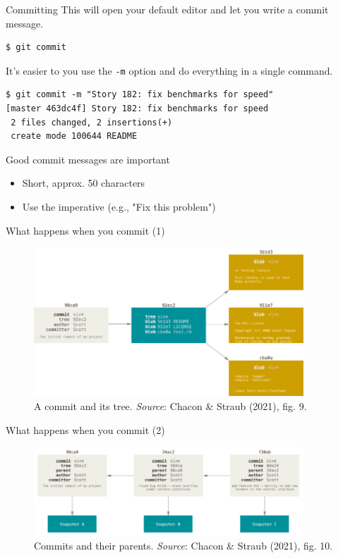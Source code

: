 \documentclass[handout]{beamer}
\begin{document}
\begin{frame}[fragile]{Committing}
This will open your default editor and let you write a commit message.
\begin{lstlisting}
$ git commit
\end{lstlisting}
It's easier to you use the \texttt{-m} option and do everything in a single command.
\begin{lstlisting}
$ git commit -m "Story 182: fix benchmarks for speed"
[master 463dc4f] Story 182: fix benchmarks for speed
 2 files changed, 2 insertions(+)
 create mode 100644 README
\end{lstlisting}
Good commit messages are important
\begin{itemize}
	\item Short, approx. 50 characters
	\item Use the imperative (e.g., "Fix this problem")
\end{itemize}
\end{frame}

\begin{frame}{What happens when you commit (1)}
	\begin{figure}
		\includegraphics[width=0.9\textwidth]{figures/fig09_commit.png}
		\caption{A commit and its tree. \textit{Source}: Chacon \& Straub (2021), fig. 9.}
	\end{figure}
\end{frame}

\begin{frame}{What happens when you commit (2)}
	\begin{figure}
		\includegraphics[width=0.9\textwidth]{figures/fig10_commits_parents.png}
		\caption{Commits and their parents. \textit{Source}: Chacon \& Straub (2021), fig. 10.}
	\end{figure}
\end{frame}
\end{document}
